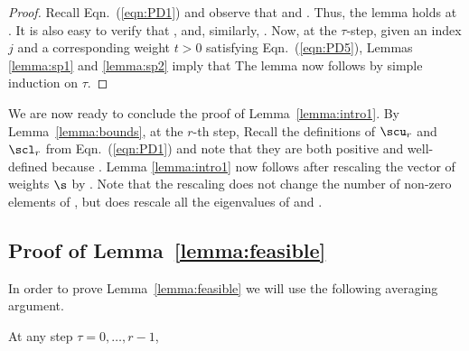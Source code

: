 \begin{proof}
Recall Eqn.~(\ref{eqn:PD1}) and observe that  and . Thus, the lemma holds at . It is also easy to verify that , and, similarly, . Now, at the $\tau$-step, given an index $j$ and a corresponding weight $t > 0$ satisfying
Eqn.~(\ref{eqn:PD5}), Lemmas \ref{lemma:sp1} and \ref{lemma:sp2} imply that
The lemma now follows by simple induction on $\tau$.
\end{proof}

We are now ready to conclude the proof of Lemma~\ref{lemma:intro1}. By Lemma~\ref{lemma:bounds}, at the $r$-th step,
Recall the definitions of $\scu_r$ and $\scl_r$ from Eqn.~(\ref{eqn:PD1}) and note that they are both positive and well-defined because . Lemma \ref{lemma:intro1} now follows after
rescaling the vector of weights $\s$ by . Note that the rescaling does not change the number of non-zero elements of \math{\s}, but does rescale all the eigenvalues of  and .

\subsection{Proof of Lemma~\ref{lemma:feasible}}

In order to prove Lemma~\ref{lemma:feasible} we will use the following averaging argument.
\begin{lemma}\label{lemma:feasiblebound}
At any step $\tau=0,\ldots,r-1$,
\end{lemma}

